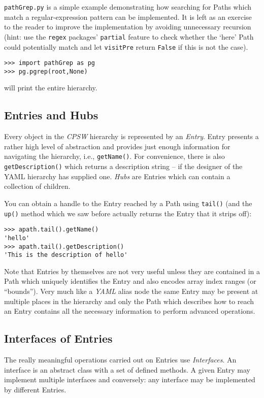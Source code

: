\documentclass[10pt]{article}
\newcommand{\ita}[1]{\emph{#1}}
\newcommand{\cpsw}      {\ita {CPSW}}
\newcommand{\yaml}      {\ita {YAML}}
\newcommand{\entry}     {{Entry}}
\newcommand{\entries}   {{Entries}}
\newcommand{\hubs}      {{Hubs}}
\newcommand{\Path}      {{Path}}
\newcommand{\Paths}     {{Paths}}
\newcommand{\cod}[1] {{\tt#1}}
\begin{document}
\cod{pathGrep.py} is a simple example demonstrating how searching for \Paths{} which match
a regular-expression pattern can be implemented. It is left as an exercise to the reader
to improve the implementation by avoiding unnecessary recursion (hint: use the \cod{regex}
packages' \cod{partial} feature to check whether the `here' Path could potentially match
and let \cod{visitPre} return \cod{False} if this is not the case).

\begin{verbatim}
>>> import pathGrep as pg 
>>> pg.pgrep(root,None)
\end{verbatim}

will print the entire hierarchy.

\subsection{Entries and Hubs}
Every object in the \cpsw{} hierarchy is represented by an {\em \entry{}}. \entry{} presents
a rather high level of abstraction and provides just enough information for navigating
the hierarchy, i.e., \cod{getName()}. For convenience, there is also \cod{getDescription()}
which returns a description string -- if the designer of the YAML hierarchy has supplied
one. {\em \hubs{}} are \entries{} which can contain a collection of children.

You can obtain a handle to the \entry{} reached by a \Path{} using \cod{tail()}
(and the \cod{up()} method which we saw before actually returns the \entry{} that
it strips off):

\begin{verbatim}
>>> apath.tail().getName()
'hello'
>>> apath.tail().getDescription()
'This is the description of hello'
\end{verbatim}

Note that \entries{} by themselves are not very useful unless they are contained in
a \Path{} which uniquely identifies the \entry{} and also encodes array index
ranges (or ``bounds'').
Very much like a \yaml{} alias node the same \entry{} may be present at
multiple places in the hierarchy and only the \Path{} which describes how to reach
an \entry{} contains all the necessary information to perform advanced operations.

\subsection{Interfaces of Entries}
The really meaningful operations carried out on \entries{} use {\em Interfaces}.
An interface is an abstract class with a set of defined methods. A given \entry{}
may implement multiple interfaces and conversely: any interface may be implemented
by different \entries{}.
\end{document}
